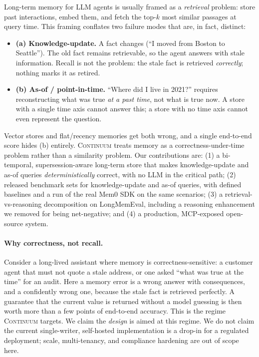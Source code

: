 \documentclass[11pt]{article}
\begin{document}
Long-term memory for LLM agents is usually framed as a \emph{retrieval} problem: store past
interactions, embed them, and fetch the top-$k$ most similar passages at query time. This framing
conflates two failure modes that are, in fact, distinct:
\begin{itemize}[leftmargin=1.4em]
  \item \textbf{(a) Knowledge-update.} A fact changes (``I moved from Boston to Seattle''). The old
  fact remains retrievable, so the agent answers with stale information. Recall is not the
  problem: the stale fact is retrieved \emph{correctly}; nothing marks it as retired.
  \item \textbf{(b) As-of / point-in-time.} ``Where did I live in 2021?'' requires reconstructing
  what was true \emph{at a past time}, not what is true now. A store with a single time axis cannot
  answer this; a store with no time axis cannot even represent the question.
\end{itemize}
Vector stores and flat/recency memories get both wrong, and a single end-to-end score hides (b)
entirely. \textsc{Continuum} treats memory as a correctness-under-time problem rather than a
similarity problem. Our contributions are: (1) a bi-temporal, supersession-aware long-term store
that makes knowledge-update and as-of queries \emph{deterministically} correct, with no LLM in the
critical path; (2) released benchmark sets for knowledge-update and as-of queries, with defined
baselines and a run of the real Mem0 SDK on the same scenarios; (3) a retrieval-vs-reasoning
decomposition on LongMemEval, including a reasoning enhancement we removed for being net-negative;
and (4) a production, MCP-exposed open-source system.

\paragraph{Why correctness, not recall.} Consider a long-lived assistant where memory is
correctness-sensitive: a customer agent that must not quote a stale address, or one asked ``what
was true at the time'' for an audit. Here a memory error is a wrong answer with consequences, and a
confidently wrong one, because the stale fact is retrieved perfectly. A guarantee that the current
value is returned without a model guessing is then worth more than a few points of end-to-end
accuracy. This is the regime \textsc{Continuum} targets. We claim the \emph{design} is aimed at
this regime. We do not claim the current single-writer, self-hosted implementation is a drop-in for
a regulated deployment; scale, multi-tenancy, and compliance hardening are out of scope here.
\end{document}
